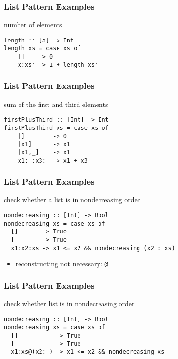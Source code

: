 \documentclass[dvipsnames]{beamer}
\theoremstyle{plain}
\begin{document}
\begin{frame}[fragile]
  \frametitle{List Pattern Examples}

  \begin{exampleblock}{number of elements}
    \begin{lstlisting}[deletekeywords={length}]
length :: [a] -> Int
length xs = case xs of
    []    -> 0
    x:xs' -> 1 + length xs'
    \end{lstlisting}
  \end{exampleblock}
\end{frame}

\begin{frame}[fragile]
  \frametitle{List Pattern Examples}

  \begin{exampleblock}{sum of the first and third elements}
    \begin{lstlisting}
firstPlusThird :: [Int] -> Int
firstPlusThird xs = case xs of
    []        -> 0
    [x1]      -> x1
    [x1,_]    -> x1
    x1:_:x3:_ -> x1 + x3
    \end{lstlisting}
  \end{exampleblock}
\end{frame}

\begin{frame}[fragile]
  \frametitle{List Pattern Examples}

  \begin{exampleblock}{check whether a list is in nondecreasing order}
    \begin{lstlisting}
nondecreasing :: [Int] -> Bool
nondecreasing xs = case xs of
  []       -> True
  [_]      -> True
  x1:x2:xs -> x1 <= x2 && nondecreasing (x2 : xs)
    \end{lstlisting}
  \end{exampleblock}

  \begin{itemize}
    \item reconstructing not necessary: \lstinline|@|
  \end{itemize}
\end{frame}

\begin{frame}[fragile]
  \frametitle{List Pattern Examples}

  \begin{exampleblock}{check whether list is in nondecreasing order}
    \begin{lstlisting}
nondecreasing :: [Int] -> Bool
nondecreasing xs = case xs of
  []           -> True
  [_]          -> True
  x1:xs@(x2:_) -> x1 <= x2 && nondecreasing xs
    \end{lstlisting}
  \end{exampleblock}
\end{frame}
\end{document}
